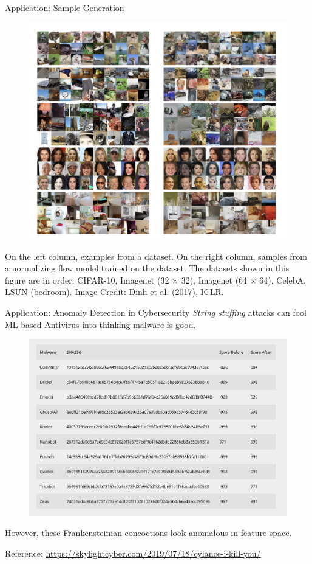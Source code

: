 \documentclass[10pt]{beamer}
\begin{document}
 
\begin{frame}{Application: Sample Generation}
\begin{figure}[H]
\includegraphics[width=.8\textwidth]{images/nf_image_samples}
\end{figure} 
\scriptsize On the left column, examples from a dataset. On the right column, samples from a normalizing flow model trained on the dataset.  \tiny The datasets shown in this figure are in order: CIFAR-10, Imagenet
(32 × 32), Imagenet (64 × 64), CelebA, LSUN (bedroom).
\vfill
\tiny \hfill Image Credit: Dinh et al. (2017), ICLR. 
 \end{frame}

\begin{frame}{Application: Anomaly Detection in Cybersecurity}
\pause
\scriptsize
\textit{String stuffing} attacks can fool ML-based Antivirus into thinking malware is good.   %

\begin{figure}[H]
\includegraphics[width=.75\textwidth]{images/string_stuffing}
\end{figure} 

However, these Frankensteinian concoctions look anomalous in feature space.
 
\vfill \vfill \vfill
\tiny \hfill Reference: \url{https://skylightcyber.com/2019/07/18/cylance-i-kill-you/}

\end{frame}
\end{document}
